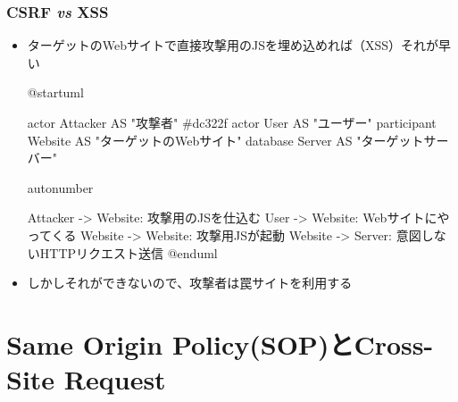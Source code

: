 \begin{frame}[fragile]
  \frametitle{CSRF \textit{vs} XSS}
  
  \begin{itemize}
    \item ターゲットのWebサイトで直接攻撃用のJSを埋め込めれば（XSS）それが早い

    \hfill{}
    \begin{center} 
      \begin{minipage}{.6\textwidth}
        \begin{plantuml}
          @startuml
       
          actor Attacker AS "攻撃者" #dc322f
          actor User AS "ユーザー"
          participant Website AS "ターゲットのWebサイト"
          database Server AS "ターゲットサーバー"

          autonumber
          
          Attacker -> Website: 攻撃用のJSを仕込む
          User -> Website: Webサイトにやってくる
          Website -> Website: 攻撃用JSが起動
          Website -> Server: 意図しないHTTPリクエスト送信
          @enduml
        \end{plantuml}
      \end{minipage}
    \end{center}
    \hfill{}
    
    \pause
    \item しかしそれができないので、攻撃者は罠サイトを利用する
  \end{itemize}
\end{frame}

\section{Same Origin Policy(SOP)とCross-Site Request}

